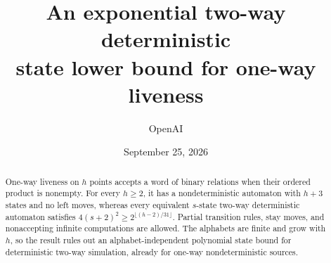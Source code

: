 \documentclass[11pt]{article}
\title{An exponential two-way deterministic\protect\\state lower bound for one-way liveness}
\author{OpenAI}
\date{September 25, 2026}
\begin{document}
\maketitle
\begin{abstract}
One-way liveness on $h$ points accepts a word of binary relations when
their ordered product is nonempty. For every $h\ge2$, it has a
nondeterministic automaton with $h+3$ states and no left moves, whereas
every equivalent $s$-state two-way deterministic automaton satisfies
$4(s+2)^2\ge2^{\lfloor(h-2)/31\rfloor}$. Partial transition rules, stay
moves, and nonaccepting infinite computations are allowed. The alphabets are
finite and grow with $h$, so the result rules out an alphabet-independent
polynomial state bound for deterministic two-way simulation, already for
one-way nondeterministic sources.
\end{abstract}






\begingroup
\raggedright

\endgroup
\end{document}

